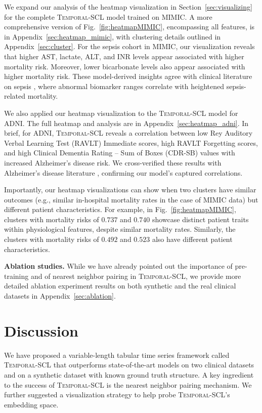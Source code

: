 \documentclass[pmlr,twocolumn,10pt]{jmlr} %
\begin{document}
We expand our analysis of the heatmap visualization in Section~\ref{sec:visualizing} for the complete \textsc{Temporal-SCL} model trained on MIMIC. A more comprehensive version of Fig.~\ref{fig:heatmapMIMIC}, encompassing all features, is in Appendix~\ref{sec:heatmap_mimic}, with clustering details outlined in Appendix~\ref{sec:cluster}. 
For the sepsis cohort in MIMIC, our visualization reveals that higher AST, lactate, ALT, and INR levels appear associated with higher mortality risk. Moreover, lower bicarbonate levels also appear associated with higher mortality risk.
These model-derived insights agree with clinical literature on sepsis \citep{nesseler2012clinical, villar2019lactate}, where abnormal biomarker ranges correlate with heightened sepsis-related mortality.

We also applied our heatmap visualization to the \textsc{Temporal-SCL} model for ADNI. The full heatmap and analysis are in Appendix~\ref{sec:heatmap_adni}. In brief, for ADNI, \textsc{Temporal-SCL} reveals a correlation between low Rey Auditory Verbal Learning Test (RAVLT) Immediate scores, high RAVLT Forgetting scores, and high Clinical Dementia Rating – Sum of Boxes (CDR-SB) values with increased Alzheimer's disease risk. We cross-verified these results with Alzheimer's disease literature \citep{o2008staging, moradi2017rey}, confirming our model's captured correlations.

Importantly, our heatmap visualizations can show when two clusters have similar outcomes (e.g., similar in-hospital mortality rates in the case of MIMIC data) but different patient characteristics.
For example, in Fig.~\ref{fig:heatmapMIMIC}, clusters with mortality risks of $0.737$ and $0.740$ showcase distinct patient traits within physiological features, despite similar mortality rates. Similarly, the clusters with mortality risks of $0.492$ and $0.523$ also have different patient characteristics.


\vspace{.2em}
\noindent
\textbf{Ablation studies.}
While we have already pointed out the importance of pre-training and of nearest neighbor pairing in \textsc{Temporal-SCL}, we provide more detailed ablation experiment results on both synthetic and the real clinical datasets in Appendix~\ref{sec:ablation}.

\vspace{-1em} 
\section{Discussion}
\vspace{-.25em}
We have proposed a variable-length tabular time series framework called \textsc{Temporal-SCL} that outperforms state-of-the-art models on two clinical datasets and on a synthetic dataset with known ground truth structure. A key ingredient to the success of \textsc{Temporal-SCL} is the nearest neighbor pairing mechanism. 
We further suggested a visualization strategy to help probe \textsc{Temporal-SCL}'s embedding space.
\end{document}

